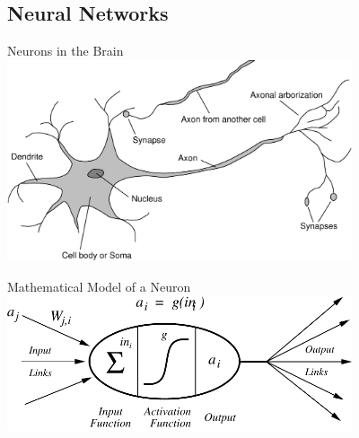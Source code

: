 \documentclass[12pt]{beamer}
\begin{document}
\subsection{Neural Networks}
\begin{frame}{Neurons in the Brain}
	\includegraphics[width=4in]{neuron}
\end{frame}
\begin{frame}{Mathematical Model of a Neuron}
	\includegraphics[width=4in]{neuron-unit}
\end{frame}
\end{document}
